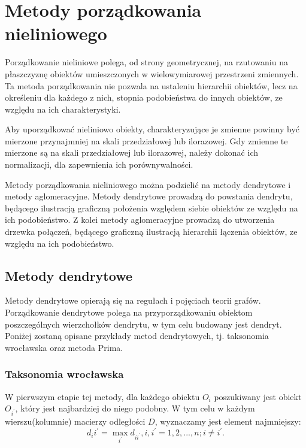 \documentclass[12pt,a4paper]{report}
\begin{document}
\section{Metody porządkowania nieliniowego}
\noindent

Porządkowanie nieliniowe polega, od strony geometrycznej, na rzutowaniu na płaszczyznę obiektów umieszczonych w wielowymiarowej przestrzeni zmiennych. Ta metoda porządkowania nie pozwala na ustaleniu hierarchii obiektów, lecz na określeniu dla każdego z nich, stopnia podobieństwa do innych obiektów, ze względu na ich charakterystyki. 

Aby uporządkować nieliniowo obiekty, charakteryzujące je zmienne powinny być mierzone przynajmniej na skali przedziałowej lub ilorazowej. Gdy zmienne te mierzone są na skali przedziałowej lub ilorazowej, należy dokonać ich normalizacji, dla zapewnienia ich porównywalności.

Metody porządkowania nieliniowego można podzielić na metody dendrytowe i metody aglomeracyjne. Metody dendrytowe prowadzą do powstania dendrytu, będącego ilustracją graficzną  położenia względem siebie obiektów ze względu na ich podobieństwo. Z kolei metody aglomeracyjne prowadzą do utworzenia drzewka połączeń, będącego graficzną ilustracją hierarchii łączenia obiektów, ze względu na ich podobieństwo.

\subsection{Metody dendrytowe}
\noindent 

Metody dendrytowe opierają się na regułach i pojęciach teorii grafów. Porządkowanie dendrytowe polega na przyporządkowaniu obiektom poszczególnych wierzchołków dendrytu, w tym celu budowany jest dendryt. Poniżej zostaną opisane przykłady metod dendrytowych, tj. taksonomia wrocławska oraz metoda Prima. 

\subsubsection{Taksonomia wrocławska}
\noindent

W pierwszym etapie tej metody, dla każdego obiektu $O_{i}$ poszukiwany jest obiekt $O_{i^{'}}$, który jest najbardziej do niego podobny. W tym celu w każdym wierszu(kolumnie) macierzy odległości $D$, wyznaczamy jest element najmniejszy: 
\begin{equation}
d_ii^{'}= \max\limits_{i^{'}} {d_{ii^{'}}}, i,i^{'}=1,2,...,n; i\neq i^{'}.
\end{equation}
\end{document}
